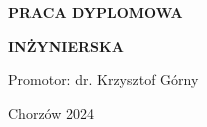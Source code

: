 {\begin{titlepage}
\begin{center}
            \vspace*{3.0 cm}
            
            \textbf{\normalsize PRACA DYPLOMOWA}\\

            \vspace*{5px}

            \textbf{\normalsize INŻYNIERSKA}\\

            \vspace*{3.0 cm}

            \begin{flushright}
                \large Promotor: dr. Krzysztof Górny
            \end{flushright}
            
            \vspace*{\fill} %
            
            \small 
            Chorzów 2024
            
        \end{center}
        
        \clearpage
    
    \end{titlepage}

    \restoregeometry
}


\begin{otherlanguage}{polish}
    \maketitle
\end{otherlanguage}
